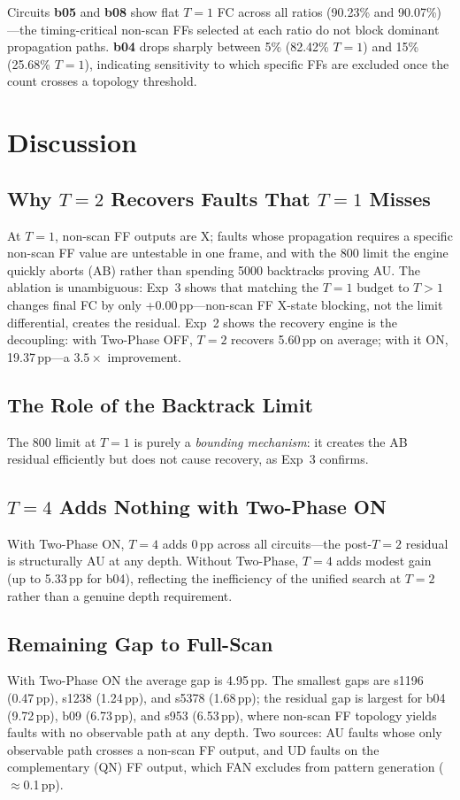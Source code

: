 \documentclass[conference]{IEEEtran}
\begin{document}
Circuits \textbf{b05} and \textbf{b08} show flat $T{=}1$ FC across all ratios
(90.23\% and 90.07\%)---the timing-critical non-scan FFs selected at each ratio
do not block dominant propagation paths. \textbf{b04} drops sharply between 5\%
(82.42\% $T{=}1$) and 15\% (25.68\% $T{=}1$), indicating sensitivity to which
specific FFs are excluded once the count crosses a topology threshold.

\section{Discussion}
\label{sec:discussion}

\subsection{Why $T{=}2$ Recovers Faults That $T{=}1$ Misses}
At $T{=}1$, non-scan FF outputs are X; faults whose propagation requires a
specific non-scan FF value are untestable in one frame, and with the 800 limit the
engine quickly aborts (AB) rather than spending 5000 backtracks proving AU. The
ablation is unambiguous: Exp~3 shows that matching the $T{=}1$ budget to $T{>}1$
changes final FC by only +0.00\,pp---non-scan FF X-state blocking, not the
limit differential, creates the residual. Exp~2 shows the recovery engine is the
decoupling: with Two-Phase OFF, $T{=}2$ recovers 5.60\,pp on average; with it
ON, 19.37\,pp---a $3.5{\times}$ improvement.

\subsection{The Role of the Backtrack Limit}
The 800 limit at $T{=}1$ is purely a \emph{bounding mechanism}: it creates the AB
residual efficiently but does not cause recovery, as Exp~3 confirms.

\subsection{$T{=}4$ Adds Nothing with Two-Phase ON}
With Two-Phase ON, $T{=}4$ adds 0\,pp across all circuits---the post-$T{=}2$
residual is structurally AU at any depth. Without Two-Phase, $T{=}4$ adds modest
gain (up to 5.33\,pp for b04), reflecting the inefficiency of the unified
search at $T{=}2$ rather than a genuine depth requirement.

\subsection{Remaining Gap to Full-Scan}
With Two-Phase ON the average gap is 4.95\,pp. The smallest gaps are s1196
(0.47\,pp), s1238 (1.24\,pp), and s5378 (1.68\,pp); the residual gap is largest
for b04 (9.72\,pp), b09 (6.73\,pp), and s953 (6.53\,pp), where non-scan FF
topology yields faults with no observable path at any depth. Two sources: AU
faults whose only observable path crosses a non-scan FF output, and UD faults on
the complementary (QN) FF output, which FAN excludes from pattern generation
($\approx$0.1\,pp).
\end{document}
